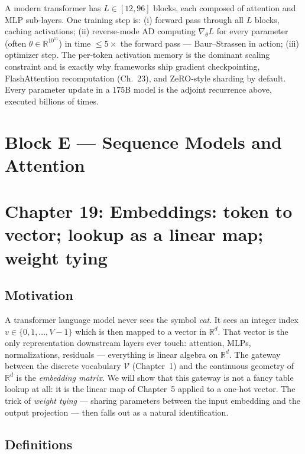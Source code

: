 \documentclass[11pt]{article}
\theoremstyle{remark}
\begin{document}
A modern transformer has $L\in[12,96]$ blocks, each composed of attention and
MLP sub-layers. One training step is: (i) forward pass through all $L$
blocks, caching activations; (ii) reverse-mode AD computing $\nabla_\theta L$
for every parameter (often $\theta\in\mathbb{R}^{10^{11}}$) in time $\le 5\times$
the forward pass — Baur--Strassen in action; (iii) optimizer step. The
per-token activation memory is the dominant scaling constraint and is exactly
why frameworks ship gradient checkpointing, FlashAttention recomputation
(Ch.~23), and ZeRO-style sharding by default. Every parameter update in a
175B model is the adjoint recurrence above, executed billions of times.



\section*{Block E --- Sequence Models and Attention}

\section*{Chapter 19: Embeddings: token to vector; lookup as a linear map; weight tying}

\subsection*{Motivation}

A transformer language model never sees the symbol \emph{cat}. It sees an integer index $v\in\{0,1,\dots,V-1\}$ which is then mapped to a vector in $\mathbb{R}^d$. That vector is the only representation downstream layers ever touch: attention, MLPs, normalizations, residuals --- everything is linear algebra on $\mathbb{R}^d$. The gateway between the discrete vocabulary $\mathcal{V}$ (Chapter~1) and the continuous geometry of $\mathbb{R}^d$ is the \emph{embedding matrix}. We will show that this gateway is not a fancy table lookup at all: it is the linear map of Chapter~5 applied to a one-hot vector. The trick of \emph{weight tying} --- sharing parameters between the input embedding and the output projection --- then falls out as a natural identification.

\subsection*{Definitions}
\end{document}
